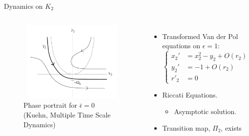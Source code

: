 \documentclass[11pt]{beamer}
\begin{document}
\begin{frame}{Dynamics on $K_2$}
\begin{columns}
\begin{figure}
    \centering
    \includegraphics[height=4cm,width=6cm]{Dynamics_in_K2.png}
    \caption{Phase portrait for $\bar{\epsilon}=0$ (Kuehn, Multiple Time Scale Dynamics)}

\end{figure}
\begin{itemize}
\item Transformed Van der Pol equations on $ \epsilon=1$:
\begin{equation*}
    \begin{cases}
         x_2' &= x_2^2-y_2+O(r_2)\\
         y_2' &= -1+O(r_2)\\
        r'_2&=0
    \end{cases}
\end{equation*}
\item Riccati Equations.
\begin{itemize}
\item Asymptotic solution.
\end{itemize}
\item Transition map, $\Pi_2$, exists

\end{itemize}
\end{columns}
\end{frame}
\end{document}
